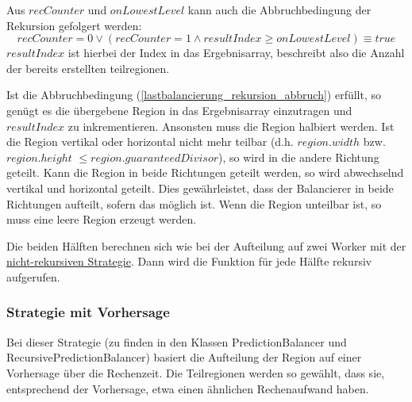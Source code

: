 Aus $recCounter$ und $onLowestLevel$ kann auch die Abbruchbedingung der Rekursion gefolgert werden:
\begin{equation} \label{lastbalancierung_rekursion_abbruch}
	recCounter = 0 \vee (recCounter = 1 \wedge resultIndex \geq onLowestLevel) \equiv true
\end{equation}
$resultIndex$ ist hierbei der Index in das Ergebnisarray, beschreibt also die Anzahl der bereits erstellten teilregionen.

Ist die Abbruchbedingung (\ref{lastbalancierung_rekursion_abbruch}) erfüllt, so genügt es die übergebene Region in das Ergebnisarray einzutragen und $resultIndex$ zu inkrementieren.
Ansonsten muss die Region halbiert werden. Ist die Region vertikal oder horizontal nicht mehr teilbar (d.h. $region.width$ bzw. $region.height$ $\leq region.guaranteedDivisor$), so wird in die andere Richtung geteilt.
Kann die Region in beide Richtungen geteilt werden, so wird abwechselnd vertikal und horizontal geteilt. Dies gewährleistet, dass der Balancierer in beide Richtungen aufteilt, sofern das möglich ist.
Wenn die Region unteilbar ist, so muss eine leere Region erzeugt werden.

Die beiden Hälften berechnen sich wie bei der Aufteilung auf zwei Worker mit der \hyperref[lastbalancierung_naiv]{nicht-rekursiven Strategie}.
Dann wird die Funktion für jede Hälfte rekursiv aufgerufen.

\subsubsection{Strategie mit Vorhersage}

Bei dieser Strategie (zu finden in den Klassen PredictionBalancer und RecursivePredictionBalancer) basiert die Aufteilung der Region auf einer Vorhersage über die Rechenzeit.
Die Teilregionen werden so gewählt, dass sie, entsprechend der Vorhersage, etwa einen ähnlichen Rechenaufwand haben.

